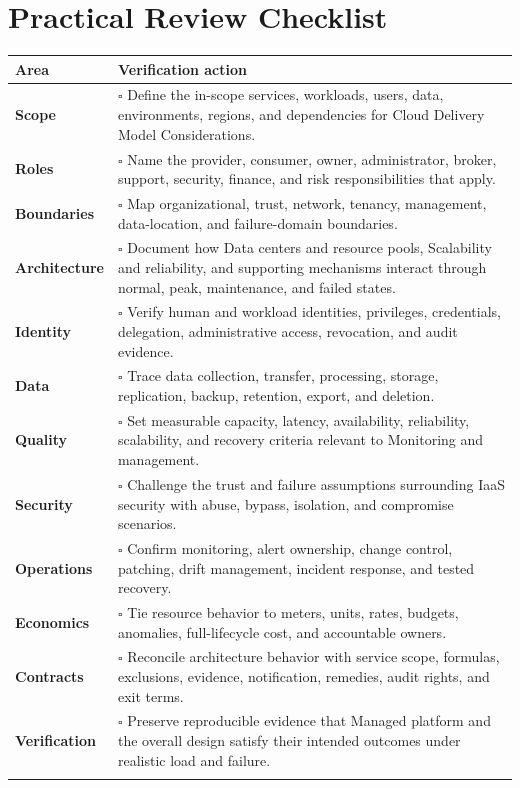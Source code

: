 \documentclass[11pt]{article}
\begin{document}
\section{Practical Review Checklist}
\begin{longtable}{@{}>{\bfseries\color{Teal}}p{}>{\RaggedRight\arraybackslash}p{}@{}}
\toprule\textbf{Area} & \textbf{Verification action}\\\midrule\endhead
Scope & $\square$ Define the in-scope services, workloads, users, data, environments, regions, and dependencies for Cloud Delivery Model Considerations. \\\addlinespace[2pt]
Roles & $\square$ Name the provider, consumer, owner, administrator, broker, support, security, finance, and risk responsibilities that apply. \\\addlinespace[2pt]
Boundaries & $\square$ Map organizational, trust, network, tenancy, management, data-location, and failure-domain boundaries. \\\addlinespace[2pt]
Architecture & $\square$ Document how Data centers and resource pools, Scalability and reliability, and supporting mechanisms interact through normal, peak, maintenance, and failed states. \\\addlinespace[2pt]
Identity & $\square$ Verify human and workload identities, privileges, credentials, delegation, administrative access, revocation, and audit evidence. \\\addlinespace[2pt]
Data & $\square$ Trace data collection, transfer, processing, storage, replication, backup, retention, export, and deletion. \\\addlinespace[2pt]
Quality & $\square$ Set measurable capacity, latency, availability, reliability, scalability, and recovery criteria relevant to Monitoring and management. \\\addlinespace[2pt]
Security & $\square$ Challenge the trust and failure assumptions surrounding IaaS security with abuse, bypass, isolation, and compromise scenarios. \\\addlinespace[2pt]
Operations & $\square$ Confirm monitoring, alert ownership, change control, patching, drift management, incident response, and tested recovery. \\\addlinespace[2pt]
Economics & $\square$ Tie resource behavior to meters, units, rates, budgets, anomalies, full-lifecycle cost, and accountable owners. \\\addlinespace[2pt]
Contracts & $\square$ Reconcile architecture behavior with service scope, formulas, exclusions, evidence, notification, remedies, audit rights, and exit terms. \\\addlinespace[2pt]
Verification & $\square$ Preserve reproducible evidence that Managed platform and the overall design satisfy their intended outcomes under realistic load and failure. \\\addlinespace[2pt]
\bottomrule
\end{longtable}
\end{document}
